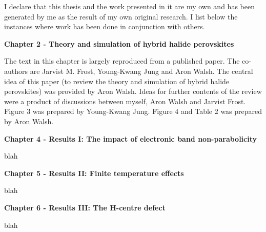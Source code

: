 I declare that this thesis and the work presented in it are my own and has been generated by me as the result of my own original research. I list below the instances where work has been done in conjunction with others.
\vspace{\frontmatterbaselineskip}

\textbf{Chapter 2 - Theory and simulation of hybrid halide perovskites } 

The text in this chapter is largely reproduced from a published paper.\autocite{Whalley2017} The co-authors are Jarvist M. Frost, Young-Kwang Jung and Aron Walsh.
The central idea of this paper (to review the theory and simulation of hybrid halide perovskites) was provided by Aron Walsh. Ideas for further contents of the review were a product of discussions between myself, Aron Walsh and Jarvist Frost. Figure 3 was prepared by Young-Kwang Jung. Figure 4 and Table 2 was prepared by Aron Walsh. 

\vspace{\frontmatterbaselineskip}

\textbf{Chapter 4  - Results I: The impact of electronic band non-parabolicity}

blah 
\vspace{\frontmatterbaselineskip}

\textbf{Chapter 5  - Results II: Finite temperature effects}

blah 
\vspace{\frontmatterbaselineskip}

\textbf{Chapter 6  - Results III: The H-centre defect}

blah 